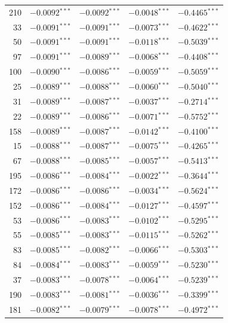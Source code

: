 \documentclass[review,authoryear]{elsarticle}
\begin{document}
\begin{longtable}{rrrrr}
210 & $-0.0092$$^{***}$ & $-0.0092$$^{***}$ & $-0.0048$$^{***}$ & $-0.4465$$^{***}$ \\
33 & $-0.0091$$^{***}$ & $-0.0091$$^{***}$ & $-0.0073$$^{***}$ & $-0.4622$$^{***}$ \\
50 & $-0.0091$$^{***}$ & $-0.0091$$^{***}$ & $-0.0118$$^{***}$ & $-0.5039$$^{***}$ \\
97 & $-0.0091$$^{***}$ & $-0.0089$$^{***}$ & $-0.0068$$^{***}$ & $-0.4408$$^{***}$ \\
100 & $-0.0090$$^{***}$ & $-0.0086$$^{***}$ & $-0.0059$$^{***}$ & $-0.5059$$^{***}$ \\
25 & $-0.0089$$^{***}$ & $-0.0088$$^{***}$ & $-0.0060$$^{***}$ & $-0.5040$$^{***}$ \\
31 & $-0.0089$$^{***}$ & $-0.0087$$^{***}$ & $-0.0037$$^{***}$ & $-0.2714$$^{***}$ \\
22 & $-0.0089$$^{***}$ & $-0.0086$$^{***}$ & $-0.0071$$^{***}$ & $-0.5752$$^{***}$ \\
158 & $-0.0089$$^{***}$ & $-0.0087$$^{***}$ & $-0.0142$$^{***}$ & $-0.4100$$^{***}$ \\
15 & $-0.0088$$^{***}$ & $-0.0087$$^{***}$ & $-0.0075$$^{***}$ & $-0.4265$$^{***}$ \\
67 & $-0.0088$$^{***}$ & $-0.0085$$^{***}$ & $-0.0057$$^{***}$ & $-0.5413$$^{***}$ \\
195 & $-0.0086$$^{***}$ & $-0.0084$$^{***}$ & $-0.0022$$^{***}$ & $-0.3644$$^{***}$ \\
172 & $-0.0086$$^{***}$ & $-0.0086$$^{***}$ & $-0.0034$$^{***}$ & $-0.5624$$^{***}$ \\
152 & $-0.0086$$^{***}$ & $-0.0084$$^{***}$ & $-0.0127$$^{***}$ & $-0.4597$$^{***}$ \\
53 & $-0.0086$$^{***}$ & $-0.0083$$^{***}$ & $-0.0102$$^{***}$ & $-0.5295$$^{***}$ \\
55 & $-0.0085$$^{***}$ & $-0.0083$$^{***}$ & $-0.0115$$^{***}$ & $-0.5262$$^{***}$ \\
83 & $-0.0085$$^{***}$ & $-0.0082$$^{***}$ & $-0.0066$$^{***}$ & $-0.5303$$^{***}$ \\
84 & $-0.0084$$^{***}$ & $-0.0083$$^{***}$ & $-0.0059$$^{***}$ & $-0.5230$$^{***}$ \\
37 & $-0.0083$$^{***}$ & $-0.0078$$^{***}$ & $-0.0064$$^{***}$ & $-0.5239$$^{***}$ \\
190 & $-0.0083$$^{***}$ & $-0.0081$$^{***}$ & $-0.0036$$^{***}$ & $-0.3399$$^{***}$ \\
181 & $-0.0082$$^{***}$ & $-0.0079$$^{***}$ & $-0.0078$$^{***}$ & $-0.4972$$^{***}$ \\

\end{longtable}
\end{document}
